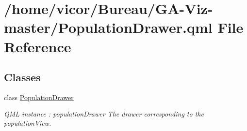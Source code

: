 \hypertarget{_population_drawer_8qml}{}\section{/home/vicor/\+Bureau/\+G\+A-\/\+Viz-\/master/\+Population\+Drawer.qml File Reference}
\label{_population_drawer_8qml}
\subsection*{Classes}
\begin{DoxyCompactItemize}
\item 
class \hyperlink{class_population_drawer}{Population\+Drawer}
\begin{DoxyCompactList}\small\item\em Q\+ML instance \+: population\+Drawer The drawer corresponding to the population\+View. \end{DoxyCompactList}\end{DoxyCompactItemize}
